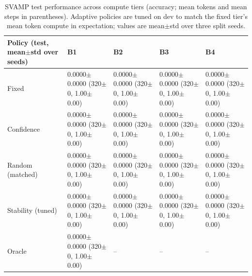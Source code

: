 \begin{table}[t]
\centering
\small
\setlength{\tabcolsep}{3pt}
\renewcommand{\arraystretch}{1.1}
\begin{tabularx}{\textwidth}{lYYYY}
\toprule
Policy (test, mean$\pm$std over seeds) & B1 & B2 & B3 & B4 \\
\midrule
Fixed & 0.0000$\pm$0.0000 (320$\pm$0, 1.00$\pm$0.00) & 0.0000$\pm$0.0000 (320$\pm$0, 1.00$\pm$0.00) & 0.0000$\pm$0.0000 (320$\pm$0, 1.00$\pm$0.00) & 0.0000$\pm$0.0000 (320$\pm$0, 1.00$\pm$0.00) \\
\addlinespace
Confidence & 0.0000$\pm$0.0000 (320$\pm$0, 1.00$\pm$0.00) & 0.0000$\pm$0.0000 (320$\pm$0, 1.00$\pm$0.00) & 0.0000$\pm$0.0000 (320$\pm$0, 1.00$\pm$0.00) & 0.0000$\pm$0.0000 (320$\pm$0, 1.00$\pm$0.00) \\
Random (matched) & 0.0000$\pm$0.0000 (320$\pm$0, 1.00$\pm$0.00) & 0.0000$\pm$0.0000 (320$\pm$0, 1.00$\pm$0.00) & 0.0000$\pm$0.0000 (320$\pm$0, 1.00$\pm$0.00) & 0.0000$\pm$0.0000 (320$\pm$0, 1.00$\pm$0.00) \\
Stability (tuned) & 0.0000$\pm$0.0000 (320$\pm$0, 1.00$\pm$0.00) & 0.0000$\pm$0.0000 (320$\pm$0, 1.00$\pm$0.00) & 0.0000$\pm$0.0000 (320$\pm$0, 1.00$\pm$0.00) & 0.0000$\pm$0.0000 (320$\pm$0, 1.00$\pm$0.00) \\
Oracle & 0.0000$\pm$0.0000 (320$\pm$0, 1.00$\pm$0.00) & -- & -- & -- \\
\bottomrule
\end{tabularx}
\caption{SVAMP test performance across compute tiers (accuracy; mean tokens and mean steps in parentheses). Adaptive policies are tuned on dev to match the fixed tier's mean token compute in expectation; values are mean$\pm$std over three split seeds.}
\label{tab:router_svamp}
\end{table}
